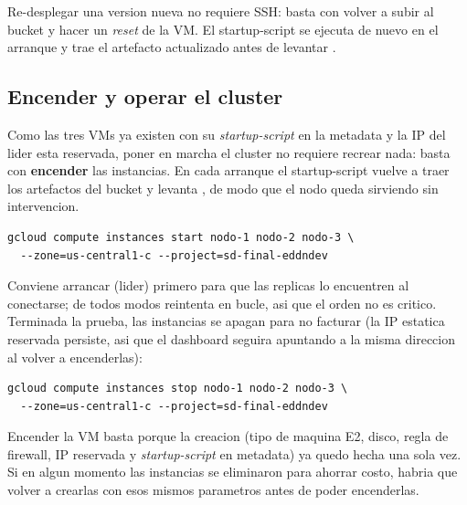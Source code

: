 \begin{nota}
Re-desplegar una version nueva no requiere SSH: basta con volver a subir
 al bucket y hacer un \emph{reset} de la VM. El startup-script
se ejecuta de nuevo en el arranque y trae el artefacto actualizado antes de
levantar .
\end{nota}

\subsection{Encender y operar el cluster}

Como las tres VMs ya existen con su \emph{startup-script} en la metadata y la IP
del lider esta reservada, poner en marcha el cluster no requiere recrear nada:
basta con \textbf{encender} las instancias. En cada arranque el startup-script
vuelve a traer los artefactos del bucket y  levanta
, de modo que el nodo queda sirviendo sin intervencion.

\begin{lstlisting}[language=none,caption={Encender el cluster (el lider primero).}]
gcloud compute instances start nodo-1 nodo-2 nodo-3 \
  --zone=us-central1-c --project=sd-final-eddndev
\end{lstlisting}

Conviene arrancar  (lider) primero para que las replicas lo
encuentren al conectarse; de todos modos \codigo{ClienteReplicacion} reintenta en
bucle, asi que el orden no es critico. Terminada la prueba, las instancias se
apagan para no facturar (la IP estatica reservada persiste, asi que el dashboard
seguira apuntando a la misma direccion al volver a encenderlas):

\begin{lstlisting}[language=none,caption={Apagar el cluster al terminar.}]
gcloud compute instances stop nodo-1 nodo-2 nodo-3 \
  --zone=us-central1-c --project=sd-final-eddndev
\end{lstlisting}

\begin{nota}
Encender la VM basta porque la creacion (tipo de maquina E2, disco, regla de
firewall, IP reservada y \emph{startup-script} en metadata) ya quedo hecha una
sola vez. Si en algun momento las instancias se eliminaron para ahorrar costo,
habria que volver a crearlas con esos mismos parametros antes de poder encenderlas.
\end{nota}

